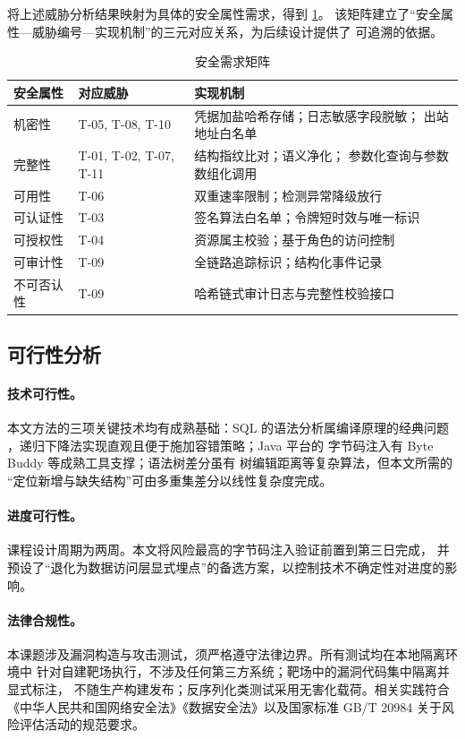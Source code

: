 将上述威胁分析结果映射为具体的安全属性需求，得到 \cref{tab:security-matrix}。
该矩阵建立了“安全属性—威胁编号—实现机制”的三元对应关系，为后续设计提供了
可追溯的依据。

\begin{table}[htbp]
\centering
\caption{安全需求矩阵}
\label{tab:security-matrix}
\small
\begin{tabular}{@{}l l p{6.4cm}@{}}
\toprule
\textbf{安全属性} & \textbf{对应威胁} & \textbf{实现机制} \\
\midrule
机密性     & T-05, T-08, T-10 & 凭据加盐哈希存储；日志敏感字段脱敏；
                                出站地址白名单 \\
完整性     & T-01, T-02, T-07, T-11 & 结构指纹比对；语义净化；
                                参数化查询与参数数组化调用 \\
可用性     & T-06 & 双重速率限制；检测异常降级放行 \\
可认证性   & T-03 & 签名算法白名单；令牌短时效与唯一标识 \\
可授权性   & T-04 & 资源属主校验；基于角色的访问控制 \\
可审计性   & T-09 & 全链路追踪标识；结构化事件记录 \\
不可否认性 & T-09 & 哈希链式审计日志与完整性校验接口 \\
\bottomrule
\end{tabular}
\end{table}

\subsection{可行性分析}

\paragraph{技术可行性。}
本文方法的三项关键技术均有成熟基础：SQL 的语法分析属编译原理的经典问题
\cite{aho2006compilers}，递归下降法实现直观且便于施加容错策略；Java 平台的
字节码注入有 Byte Buddy 等成熟工具支撑\cite{bytebuddy2024}；语法树差分虽有
树编辑距离等复杂算法\cite{zhang1989simple,bille2005survey}，但本文所需的
“定位新增与缺失结构”可由多重集差分以线性复杂度完成。

\paragraph{进度可行性。}
课程设计周期为两周。本文将风险最高的字节码注入验证前置到第三日完成，
并预设了“退化为数据访问层显式埋点”的备选方案，以控制技术不确定性对进度的影响。

\paragraph{法律合规性。}
本课题涉及漏洞构造与攻击测试，须严格遵守法律边界。所有测试均在本地隔离环境中
针对自建靶场执行，不涉及任何第三方系统；靶场中的漏洞代码集中隔离并显式标注，
不随生产构建发布；反序列化类测试采用无害化载荷。相关实践符合
《中华人民共和国网络安全法》《数据安全法》以及国家标准 GB/T 20984
关于风险评估活动的规范要求\cite{gbt20984}。

